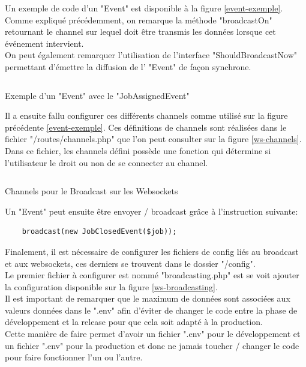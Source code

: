 \documentclass[
    iai, %
    il, %
]{heig-tb}
\begin{document}

Un exemple de code d'un "Event" est disponible à la figure \ref{event-exemple}. \\
Comme expliqué précédemment, on remarque la méthode "broadcastOn" retournant le channel sur lequel doit être transmis les données lorsque cet événement intervient. \\
On peut également remarquer l'utilisation de l'interface "ShouldBroadcastNow" permettant d'émettre la diffusion de l' "Event" de façon synchrone.

\begin{listing}[h]
    \inputminted{php}{assets/code/JobAssignedEvent.php}
    \caption{Exemple d'un "Event" avec le "JobAssignedEvent" \label{event-exemple}}
\end{listing}

Il a ensuite fallu configurer ces différents channels comme utilisé sur la figure précédente \ref{event-exemple}. Ces définitions de channels sont réalisées dans le fichier "/routes/channels.php" que l'on peut consulter sur la figure \ref{ws-channels}. \\
Dans ce fichier, les channels défini possède une fonction qui détermine si l'utilisateur le droit ou non de se connecter au channel.

\begin{listing}[h]
    \inputminted{php}{assets/code/channels.php}
    \caption{Channels pour le Broadcast sur les Websockets \label{ws-channels}}
\end{listing}

Un "Event" peut ensuite être envoyer / broadcast grâce à l'instruction suivante:
\begin{verbatim}
    broadcast(new JobClosedEvent($job));
\end{verbatim}

Finalement, il est nécessaire de configurer les fichiers de config liés au \Gls{broadcast} et aux \Gls{websockets}, ces derniers se trouvent dans le dossier "/config". \\
Le premier fichier à configurer est nommé "broadcasting.php" est se voit ajouter la configuration disponible sur la figure \ref{ws-broadcasting}. \\
Il est important de remarquer que le maximum de données sont associées aux valeurs données dans le ".env" afin d'éviter de changer le code entre la phase de développement et la release pour que cela soit adapté à la production. \\
Cette manière de faire permet d'avoir un fichier ".env" pour le développement et un fichier ".env" pour la production et donc ne jamais toucher / changer le code pour faire fonctionner l'un ou l'autre.
\end{document}
